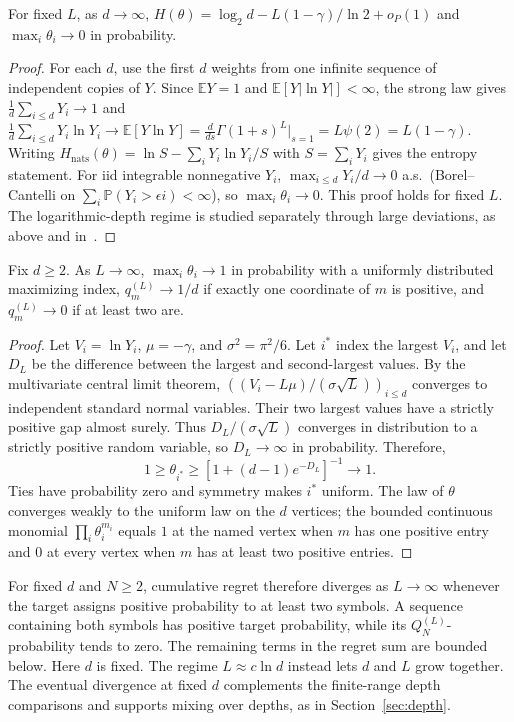 \documentclass[anon]{alt2027}
\newcommand{\E}{\mathbb{E}}
\newcommand{\Prob}{\mathbb{P}}
\begin{document}
\begin{proposition}
For fixed $L$, as $d\to\infty$, $H(\theta)=\log_2d-L(1-\gamma)/\ln2+o_P(1)$ and $\max_i\theta_i\to0$ in probability.
\end{proposition}
\begin{proof}
For each $d$, use the first $d$ weights from one infinite sequence of independent copies of $Y$. Since $\E Y=1$ and $\E[Y|\ln Y|]<\infty$, the strong law gives $\frac1d\sum_{i\le d}Y_i\to1$ and $\frac1d\sum_{i\le d}Y_i\ln Y_i\to\E[Y\ln Y]=\frac{d}{ds}\Gamma(1+s)^L\big|_{s=1}=L\psi(2)=L(1-\gamma)$. Writing $H_{\mathrm{nats}}(\theta)=\ln S-\sum_iY_i\ln Y_i/S$ with $S=\sum_iY_i$ gives the entropy statement. For iid integrable nonnegative $Y_i$, $\max_{i\le d}Y_i/d\to0$ a.s.\ (Borel--Cantelli on $\sum_i\Prob(Y_i>\epsilon i)<\infty$), so $\max_i\theta_i\to0$. This proof holds for fixed $L$. The logarithmic-depth regime is studied separately through large deviations, as above and in~\citet{jeong2026phase}.
\end{proof}
\begin{proposition}
\label{prop:fixedd}
Fix $d\ge2$. As $L\to\infty$, $\max_i\theta_i\to1$ in probability with a uniformly distributed maximizing index, $q^{(L)}_m\to1/d$ if exactly one coordinate of $m$ is positive, and $q^{(L)}_m\to0$ if at least two are.
\end{proposition}
\begin{proof}
Let $V_i=\ln Y_i$, $\mu=-\gamma$, and $\sigma^2=\pi^2/6$. Let $i^*$ index the largest $V_i$, and let $D_L$ be the difference between the largest and second-largest values. By the multivariate central limit theorem, $((V_i-L\mu)/(\sigma\sqrt L))_{i\le d}$ converges to independent standard normal variables. Their two largest values have a strictly positive gap almost surely. Thus $D_L/(\sigma\sqrt L)$ converges in distribution to a strictly positive random variable, so $D_L\to\infty$ in probability. Therefore, \[1\ge\theta_{i^*}\ge[1+(d-1)e^{-D_L}]^{-1}\to1.\] Ties have probability zero and symmetry makes $i^*$ uniform. The law of $\theta$ converges weakly to the uniform law on the $d$ vertices; the bounded continuous monomial $\prod_i\theta_i^{m_i}$ equals $1$ at the named vertex when $m$ has one positive entry and $0$ at every vertex when $m$ has at least two positive entries.
\end{proof}
For fixed $d$ and $N\ge2$, cumulative regret therefore diverges as $L\to\infty$ whenever the target assigns positive probability to at least two symbols. A sequence containing both symbols has positive target probability, while its $Q_N^{(L)}$-probability tends to zero. The remaining terms in the regret sum are bounded below. Here $d$ is fixed. The regime $L\approx c\ln d$ instead lets $d$ and $L$ grow together. The eventual divergence at fixed $d$ complements the finite-range depth comparisons and supports mixing over depths, as in Section~\ref{sec:depth}.
\end{document}
